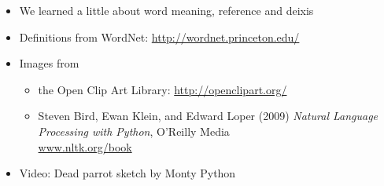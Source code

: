 \documentclass[a4paper,landscape,headrule,footrule,xetex]{foils}
\begin{document}

\begin{itemize}
\item We learned a little about word meaning, reference and deixis
\end{itemize}



\begin{itemize}
\item Definitions from WordNet: \url{http://wordnet.princeton.edu/}
\item Images from
  \begin{itemize}
  \item the Open Clip Art Library: \url{http://openclipart.org/}
  \item Steven Bird, Ewan Klein, and Edward Loper (2009) 
     \textit{Natural Language Processing with Python}, O'Reilly Media
    \\ \url{www.nltk.org/book}
\end{itemize}
\item Video: Dead parrot sketch by Monty Python
\end{itemize}









  
\small


\end{document}
